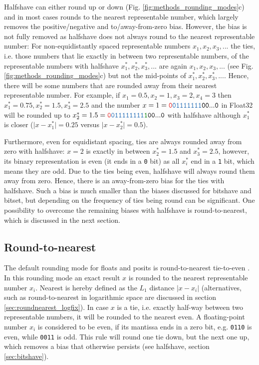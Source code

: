 Halfshave can either round up or down (Fig. \ref{fig:methods_rounding_modes}c) and in most cases rounds to the nearest representable
number, which largely removes the positive/negative and to/away-from-zero bias. However, the bias is not fully removed as halfshave does
not always round to the nearest representable number: For non-equidistantly spaced representable numbers $x_1,x_2,x_3,...$ the
ties, i.e. those numbers that lie exactly in between two representable numbers, of the representable numbers with halfshave
$x_1^*,x_2^*,x_3^*,...$ are again $x_1,x_2,x_3,...$ (see Fig. \ref{fig:methods_rounding_modes}c) but not the mid-points of $x_1^*,x_2^*,x_3^*,...$.
Hence, there will be some numbers that are rounded away from their nearest representable number.
For example, if $x_1 = 0.5, x_2 = 1, x_3 = 2, x_4 = 3$ then $x_1^* = 0.75,x_2^* = 1.5,x_3^*=2.5$ and the number
$x = 1 = \mathtt{{\color{psign}0}{\color{pexpo}01111111}00...0}$ in Float32 will be rounded up to
$x_2^* = 1.5 = \mathtt{{\color{psign}0}{\color{pexpo}011111111}{\color{mygreen}1}00...0}$ with halfshave although $x_1^*$ is closer
($\vert x - x_1^* \vert = 0.25$ versus $\vert x - x_2^* \vert = 0.5$).

Furthermore, even for equidistant spacing, ties are always rounded away from zero with halfshave: $x = 2$ is exactly in between
$x_2^*=1.5$ and $x_3^* = 2.5$, however, its binary representation is even (it ends in a \texttt{0} bit) as all $x_i^*$ end in a \texttt{1} bit,
which means they are odd. Due to the ties being even, halfshave will always round them away from zero. Hence, there is an away-from-zero bias
for the ties with halfshave. Such a bias is much smaller than the biases discussed for bitshave and bitset, but depending on
the frequency of ties being round can be significant. One possibility to overcome the remaining biases with halfshave is
round-to-nearest, which is discussed in the next section.

\subsection{Round-to-nearest}
\label{sec:roundnearest}

The default rounding mode for floats and posits is round-to-nearest tie-to-even \citep{IEEE1985}. In this rounding mode an
exact result $x$ is rounded to the nearest representable number $x_i$. Nearest is hereby defined as the $L_1$ distance
$\vert x - x_i \vert$ (alternatives, such as round-to-nearest in logarithmic space are discussed in section
\ref{sec:roundnearest_logfix}). In case $x$ is a tie, i.e. exactly half-way between two representable numbers, it will
be rounded to the nearest even. A floating-point number $x_i$ is considered to be even, if its mantissa ends in a zero bit,
e.g. \texttt{0110} is even, while \texttt{0011} is odd. This rule will round one tie down, but the next one up, which removes
a bias that otherwise persists (see halfshave, section \ref{sec:bitshave}).

